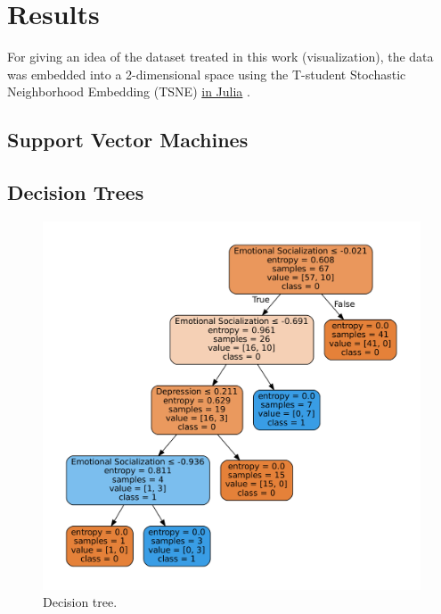 \documentclass[conference]{IEEEtran}
\theoremstyle{definition}
\theoremstyle{remark}
\theoremstyle{remark}
\begin{document}
\section{Results}\label{sec:res}
For giving an idea of the dataset treated in this work (visualization), the data
was embedded into a 2-dimensional space using the T-student Stochastic
Neighborhood Embedding (TSNE) \href{https://github.com/lejon/TSne.jl}{in Julia}
\parencite{maaten2008}.

\subsection{Support Vector Machines}

\subsection{Decision Trees}
\begin{figure}
    \includegraphics[width=\columnwidth]{figs/tree-graph.pdf}
    \caption{Decision tree.}
    \label{fig:dt}
\end{figure}
\end{document}
